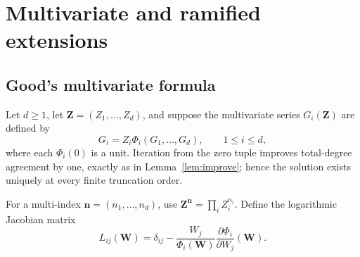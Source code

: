 \documentclass[11pt]{article}
\theoremstyle{definition}
\begin{document}
\section{Multivariate and ramified extensions}\label{sec:extensions}

\subsection{Good's multivariate formula}

Let \(d\ge1\), let \(\mathbf Z=(Z_1,\ldots,Z_d)\), and suppose the
multivariate series \(G_i(\mathbf Z)\) are defined by
\begin{equation}\label{eq:multi-fixed}
 G_i=Z_i\Phi_i(G_1,\ldots,G_d),\qquad 1\le i\le d,
\end{equation}
where each \(\Phi_i(0)\) is a unit.  Iteration from the zero tuple improves
total-degree agreement by one, exactly as in Lemma~\ref{lem:improve}; hence the
solution exists uniquely at every finite truncation order.

For a multi-index \(\mathbf n=(n_1,\ldots,n_d)\), use
\(\mathbf Z^{\mathbf n}=\prod_iZ_i^{n_i}\).  Define the logarithmic Jacobian
matrix
\begin{equation}\label{eq:good-matrix}
 L_{ij}(\mathbf W)=
 \delta_{ij}-\frac{W_j}{\Phi_i(\mathbf W)}
                    \frac{\partial\Phi_i}{\partial W_j}(\mathbf W).
\end{equation}
\end{document}
